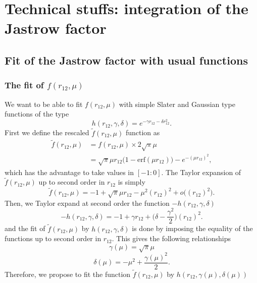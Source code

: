 \documentclass[aip,jcp,reprint,noshowkeys,superscriptaddress]{revtex4-1}
\begin{document}
\section{Technical stuffs: integration of the Jastrow factor}
\subsection{Fit of the Jastrow factor with usual functions}
\subsubsection{The fit of $f(r_{12},\mu)$}
We want to be able to fit $f(r_{12},\mu)$ with simple Slater and Gaussian type functions of the type 
\begin{equation}
 h(r_{12},\gamma,\delta) = e^{-\gamma r_{12} - \delta r_{12}^2}. 
\end{equation}
First we define the rescaled $\tilde{f}(r_{12},\mu)$ function as
\begin{equation}
 \begin{aligned}
 \tilde{f}(r_{12},\mu) & = f(r_{12},\mu)\times 2\sqrt{\pi}\mu  \\
                       & = \sqrt{\pi}\mu r_{12} \bigg( 1 - \text{erf}(\mu r_{12}) \bigg) - e^{-(\mu  r_{12})^2},
 \end{aligned}
\end{equation}
which has the advantage to take values in $[-1:0]$. 
The Taylor expansion of $\tilde{f}(r_{12},\mu)$ up to second order in $r_{12}$ is simply
\begin{equation}
 \tilde{f}(r_{12},\mu) = -1 + \sqrt{\pi}\mu r_{12} - \mu^2 (r_{12})^2 + o\big((r_{12})^2\big). 
\end{equation}
Then, we Taylor expand at second order the function $-h(r_{12},\gamma,\delta)$
\begin{equation}
 -h(r_{12},\gamma,\delta) = - 1 + \gamma r_{12} + \big( \delta - \frac{\gamma^2}{2} \big) (r_{12})^2.
\end{equation}
and the fit of $\tilde{f}(r_{12},\mu)$ by $h(r_{12},\gamma,\delta)$ is done by imposing the equality of the functions up to second order in $r_{12}$. 
This gives the following relationships
\begin{equation}
 \gamma(\mu) = \sqrt{\pi} \mu
\end{equation}
\begin{equation}
 \delta(\mu) = -\mu^2 + \frac{\gamma(\mu)^2}{2}.
\end{equation}
Therefore, we propose to fit the function $\tilde{f}(r_{12},\mu)$ by $h(r_{12},\gamma(\mu),\delta(\mu))$ 
\end{document}
